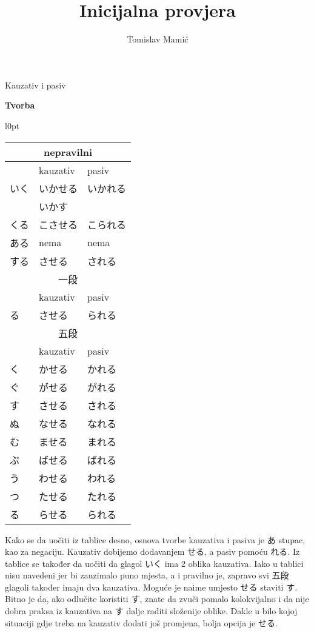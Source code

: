 \documentclass[12pt]{article}
\author{Tomislav Mamić}
\title{Inicijalna provjera}
\begin{document}
	\large Kauzativ i pasiv
	
	\vspace{20pt}
	\normalsize \textbf{Tvorba}
	\vspace{20pt}

\begin{wraptable}[22]{l}{0pt}
	\begin{tabular}{|l|l|l|}
		\hline
		\multicolumn{3}{|c|}{nepravilni}\\
		\hline
		&kauzativ&pasiv\\
		\hline
		いく&いかせる&いかれる\\
		&いかす&\\
		くる&こさせる&こられる\\
		ある&nema\footnotemark[1]&nema\footnotemark[1]\\
		する&させる&される\\
		\hline
		\hline
		\multicolumn{3}{|c|}{一段}\\
		\hline
		&kauzativ&pasiv\\
		\hline
		る&させる&られる\footnotemark[2]\\
		\hline
		\hline
		\multicolumn{3}{|c|}{五段}\\
		\hline
		&kauzativ&pasiv\\
		\hline
		く&かせる&かれる\\
		ぐ&がせる&がれる\\
		す&させる&される\\
		\hline
		ぬ&なせる&なれる\\
		む&ませる&まれる\\
		ぶ&ばせる&ばれる\\
		\hline
		う&わせる&われる\\
		つ&たせる&たれる\\
		る&らせる&られる\\
		\hline
	\end{tabular}
\end{wraptable}

	Kako se da uočiti iz tablice desno, osnova tvorbe kauzativa i pasiva je あ stupac, kao za negaciju. Kauzativ dobijemo dodavanjem せる, a pasiv pomoću れる. Iz tablice se također da uočiti da glagol いく ima 2 oblika kauzativa. Iako u tablici nisu navedeni jer bi zauzimalo puno mjesta, a i pravilno je, zapravo svi 五段 glagoli također imaju dva kauzativa. Moguće je naime umjesto せる staviti す. Bitno je da, ako odlučite koristiti す, znate da zvuči pomalo kolokvijalno i da nije dobra praksa iz kauzativa na す dalje raditi složenije oblike. Dakle u bilo kojoj situaciji gdje treba na kauzativ dodati još promjena, bolja opcija je せる.
	
\end{document}
